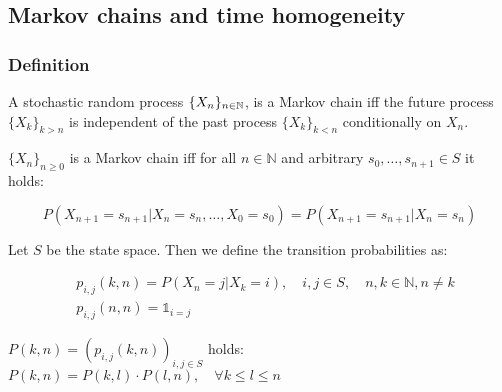 \subsection{Markov chains and time homogeneity}
 \begin{frame}\frametitle{Definition}
    \vspace{1em}
    \begin{definition}
    A stochastic random process \(\{X_n\}_{n\in \mathbb{N}}\), is a Markov chain iff the 
    future process \(\{X_k\}_{k > n}\) is independent of the past process 
    \(\{X_k\}_{k < n}\) conditionally on \(X_n\).
    \end{definition}

    \begin{lemma}
    \(\{X_n\}_{n \ge 0}\) is a Markov chain iff for all \(n\in\mathbb{N}\) and 
    arbitrary \(s_0, \ldots, s_{n + 1} \in S\) it holds:

    \[
    P(X_{n + 1} = s_{n + 1} | X_n = s_n, \ldots, X_0 = s_0) = P(X_{n + 1} = s_{n + 1} | X_n = s_n)
    \]
    \end{lemma}
    
    \begin{definition}
    Let \(S\) be the state space. Then we define the transition probabilities as:

    \begin{align*}
    & p_{i, j}(k, n) = P(X_n = j | X_k = i),\quad i,j \in S, \quad n,k \in \mathbb{N}, n\neq k \\
    & p_{i, j}(n, n) = \mathds{1}_{i = j}
    \end{align*}
    \end{definition}
    
    \begin{proposition}
    \(P(k, n) = (p_{i, j}(k, n))_{i,j \in S}\) holds:
    \(P(k, n) = P(k, l) \cdot P(l, n), \quad \forall k \le l \le n
    \)
    \end{proposition}
 \end{frame}
 
